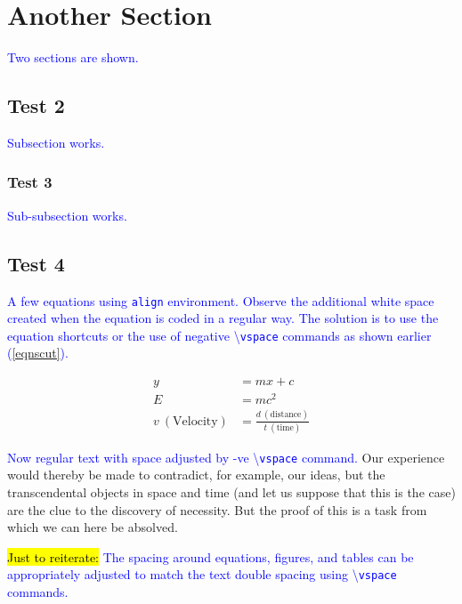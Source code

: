 \documentclass[phd]{ndsu-thesis-2022}
\newcommand\italk[1]{\textcolor{blue}{#1}}  %
\newcommand\cmd[1]{\textbackslash\texttt{#1}}  %
\begin{document}
\section{Another Section}
\italk{Two sections are shown.} \kant[7]

\subsection{Test 2}
\italk{Subsection works.}

\subsubsection{Test 3}
\italk{Sub-subsection works.}

\subsection{Test 4}
\italk{A few equations using \texttt{align} environment. Observe the additional white space created when the equation is coded in a regular way. The solution is to use the equation shortcuts or the use of negative \cmd{vspace} commands as shown earlier (\cref{eqnscut}).}

\begin{align}
y &= mx + c \\
E &= mc^2 \\
v\: (\text{Velocity}) &= \frac{d\: (\text{distance})}{t\: (\text{time})} 
\end{align}

\vspace{-1.5ex}
\italk{Now regular text with space adjusted by -ve \cmd{vspace} command.} Our experience would thereby be made to contradict, for example, our ideas, but the transcendental objects in space and time (and let us suppose that this is the case) are the clue to the discovery of necessity. But the proof of this is a task from which we can here be absolved.

\vspace{-4pt}

\italk{\hl{Just to reiterate:} The spacing around equations, figures, and tables can be appropriately adjusted to match the text double spacing using \cmd{vspace} commands.}
\end{document}

